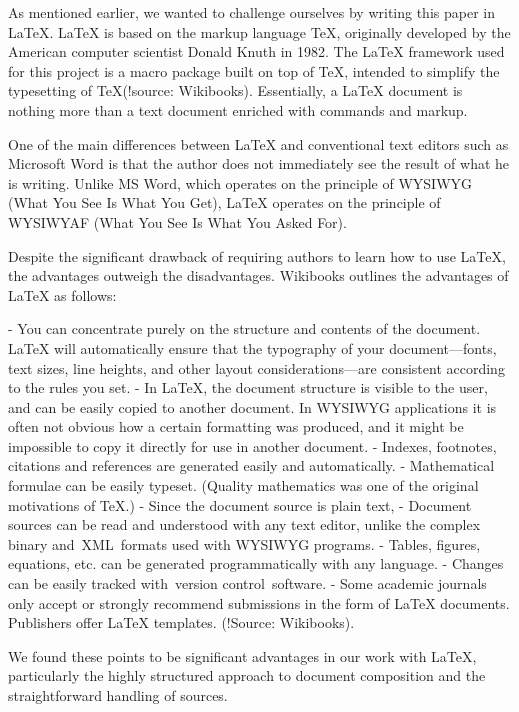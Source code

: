 As mentioned earlier, we wanted to challenge ourselves by writing this paper in \LaTeX{}. \LaTeX{} is based on the markup language TeX, originally developed by the American computer scientist Donald Knuth in 1982. The \LaTeX{} framework used for this project is \dq a macro package built on top of TeX\dq , intended to \dq simplify the typesetting of TeX\dq  (!source: Wikibooks). Essentially, a \LaTeX{} document is nothing more than a text document enriched with commands and markup.

One of the main differences between \LaTeX{} and conventional text editors such as Microsoft Word is that the author does not immediately see the result of what he is writing. Unlike MS Word, which operates on the principle of WYSIWYG (What You See Is What You Get), \LaTeX{} operates on the principle of WYSIWYAF (What You See Is What You Asked For).

Despite the significant drawback of requiring authors to learn how to use \LaTeX{}, the advantages outweigh the disadvantages. Wikibooks outlines the advantages of \LaTeX{} as follows:

- You can concentrate purely on the structure and contents of the document. \LaTeX{} will automatically ensure that the typography of your document—fonts, text sizes, line heights, and other layout considerations—are consistent according to the rules you set.
- In \LaTeX{}, the document structure is visible to the user, and can be easily copied to another document. In WYSIWYG applications it is often not obvious how a certain formatting was produced, and it might be impossible to copy it directly for use in another document.
- Indexes, footnotes, citations and references are generated easily and automatically.
- Mathematical formulae can be easily typeset. (Quality mathematics was one of the original motivations of TeX.)
- Since the document source is plain text,
    - Document sources can be read and understood with any text editor, unlike the complex binary and XML formats used with WYSIWYG programs.
    - Tables, figures, equations, etc. can be generated programmatically with any language.
    - Changes can be easily tracked with version control software.
- Some academic journals only accept or strongly recommend submissions in the form of \LaTeX{} documents. Publishers offer \LaTeX{} templates.
(!Source: Wikibooks).

We found these points to be significant advantages in our work with \LaTeX{}, particularly the highly structured approach to document composition and the straightforward handling of sources.

